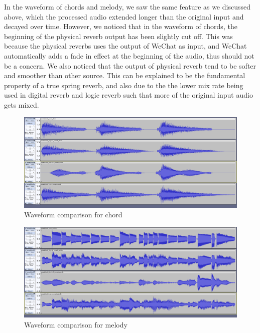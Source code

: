 \documentclass[12pt]{article}
\begin{document}
\newpage


In the waveform of chords and melody, we saw the same feature as we discussed above, which the processed audio extended longer than the original input and decayed over time. However, we noticed that in the waveform of chords, the beginning of the physical reverb output has been slightly cut off. This was because the physical reverbs uses the output of WeChat as input, and WeChat automatically adds a fade in effect at the beginning of the audio, thus should not be a concern. We also noticed that the output of physical reverb tend to be softer and smoother than other source. This can be explained to be the fundamental property of a true spring reverb, and also due to the the lower mix rate being used in digital reverb and logic reverb such that more of the original input audio gets mixed.

\begin{figure}[h]
	\center
	\includegraphics[width=\linewidth]{audio_comparison/chord_comparison_wave.png}
	\caption{Waveform comparison for chord}
\end{figure}

\begin{figure}[h]
	\center
	\includegraphics[width=\linewidth]{audio_comparison/melody_comparison_wave.png}
	\caption{Waveform comparison for melody}
\end{figure}

\newpage
\end{document}
